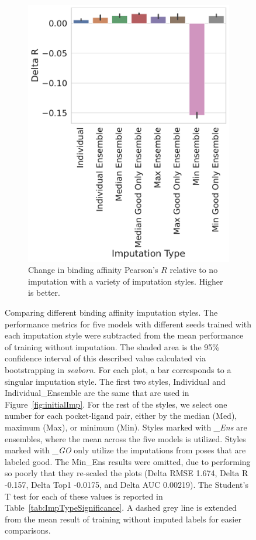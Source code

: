 \documentclass[journal=jcim,manuscript=article]{achemso}
\begin{document}
\begin{figure}[tbph]
    \hfill
    \begin{subfigure}[t]{0.48\textwidth}
        \centering
        \includegraphics[width=\linewidth]{figures/ComparingImpStylesR.pdf}
        \caption{Change in binding affinity Pearson's $R$ relative to no imputation with a variety of imputation styles. Higher is better.}
    \end{subfigure}

    \caption{Comparing different binding affinity imputation styles. The performance metrics for five models with different seeds trained with each imputation style were subtracted from the mean performance of training without imputation. The shaded area is the 95\% confidence interval of this described value calculated via bootstrapping in \textit{seaborn}. For each plot, a bar corresponds to a singular imputation style. The first two styles, Individual and Individual\_Ensemble are the same that are used in Figure~\ref{fig:initialImp}. For the rest of the styles, we select one number for each pocket-ligand pair, either by the median (Med), maximum (Max), or minimum (Min). Styles marked with \textit{\_Ens} are ensembles, where the mean across the five models is utilized. Styles marked with \textit{\_GO} only utilize the imputations from poses that are labeled good. The Min\_Ens results were omitted, due to performing so poorly that they re-scaled the plots (Delta RMSE 1.674, Delta R -0.157, Delta Top1 -0.0175, and Delta AUC 0.00219). The Student's T test for each of these values is reported in Table~\ref{tab:ImpTypeSignificance}. A dashed grey line is extended from the mean result of training without imputed labels for easier comparisons.}
    \label{fig:compareImp}
\end{figure}
\end{document}
